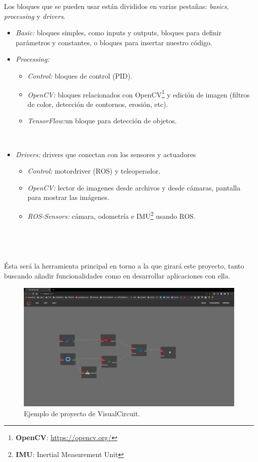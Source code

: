 Los bloques que se pueden usar están divididos en varias pestañas: \textit{basics}, \textit{processing} y \textit{drivers}.\\
\begin{itemize}
    \item \textit{Basic:} bloques simples, como inputs y outputs, bloques para definir parámetros y constantes, o bloques para insertar nuestro código.
    \item \textit{Processing:}
    \begin{itemize}
        \item \textit{Control:} bloques de control (PID).
        \item \textit{OpenCV:} bloques relacionados con OpenCV\footnote{\textbf{OpenCV}: \url{https://opencv.org/}} y edición de imagen (filtros de color, detección de contornos, erosión, etc).
        \item \textit{TensorFlow:}un bloque para detección de objetos.
    \end{itemize}\

\newpage
    \item \textit{Drivers:} drivers que conectan con los sensores y actuadores
    \begin{itemize}
        \item \textit{Control:} motordriver (ROS) y teleoperador.
        \item \textit{OpenCV:} lector de imagenes desde archivos y desde cámaras, pantalla para mostrar las imágenes.
        \item \textit{ROS-Sensors:}  cámara, odometría e IMU\footnote{\textbf{IMU}: Inertial Measurement Unit} usando ROS.
    \end{itemize}\
\end{itemize}\

Ésta será la herramienta principal en torno a la que girará este proyecto, tanto buscando añadir funcionalidades como en desarrollar aplicaciones con ella.

\begin{figure} [H]
    \begin{center}
        \includegraphics[width=13cm]{figs/c3/VC_example.png}
    \end{center}
    \caption[Ejemplo VisualCircuit]{Ejemplo de proyecto de VisualCircuit.}
    \label{fig:ex_VC}
\end{figure}




